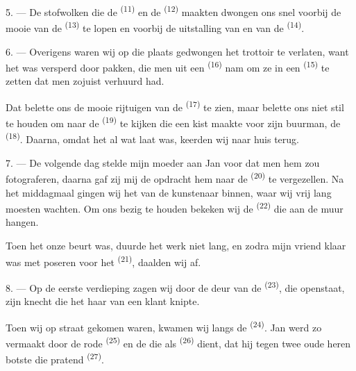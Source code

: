 5. --- De stofwolken die de  \textsuperscript{(11)} en de
 \textsuperscript{(12)} maakten dwongen ons snel voorbij de
mooie  van de  \textsuperscript{(13)} te lopen
en voorbij de uitstalling van  en  van de 
\textsuperscript{(14)}.

6. --- Overigens waren wij op die plaats gedwongen het trottoir te verlaten, want het was
versperd door pakken, die men uit een  \textsuperscript{(16)} nam om ze
in een  \textsuperscript{(15)} te zetten dat men zojuist verhuurd had.

Dat belette ons de mooie rijtuigen van de  \textsuperscript{(17)} te
zien, maar belette ons niet stil te houden om naar de
 \textsuperscript{(19)} te kijken die een kist maakte voor zijn
buurman, de  \textsuperscript{(18)}. Daarna, omdat het
al wat laat was, keerden wij naar huis terug.

\VUsaut{3.0mm}

7. --- De volgende dag stelde mijn moeder aan Jan voor dat men hem zou fotograferen, daarna
gaf zij mij de opdracht hem naar de  \textsuperscript{(20)} te vergezellen.
Na het middagmaal gingen wij het
 van de kunstenaar binnen, waar wij vrij lang moesten wachten.
Om ons bezig te houden bekeken wij de  \textsuperscript{(22)} die aan de
muur hangen.

Toen het onze beurt was, duurde het werk niet lang, en zodra mijn vriend klaar was met poseren
voor het  \textsuperscript{(21)}, daalden wij af.

8. --- Op de eerste verdieping zagen wij door de deur van de 
\textsuperscript{(23)}, die openstaat, zijn knecht die het haar van een klant knipte.

Toen wij op straat gekomen waren, kwamen wij langs de 
\textsuperscript{(24)}. Jan werd zo vermaakt door de rode 
\textsuperscript{(25)} en de  die als 
\textsuperscript{(26)} dient, dat hij tegen twee oude heren botste die pratend
 \textsuperscript{(27)}.

\VUsaut{3.0mm}

